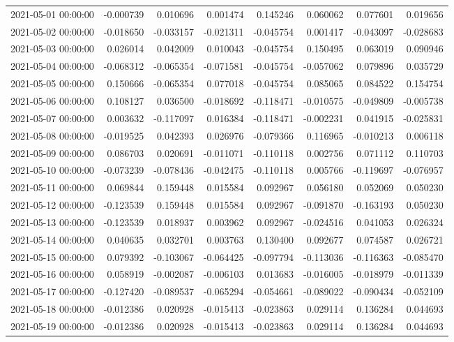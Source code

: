 \begin{tabular}{lrrrrrrr}
2021-05-01 00:00:00 & -0.000739 & 0.010696 & 0.001474 & 0.145246 & 0.060062 & 0.077601 & 0.019656 \\
2021-05-02 00:00:00 & -0.018650 & -0.033157 & -0.021311 & -0.045754 & 0.001417 & -0.043097 & -0.028683 \\
2021-05-03 00:00:00 & 0.026014 & 0.042009 & 0.010043 & -0.045754 & 0.150495 & 0.063019 & 0.090946 \\
2021-05-04 00:00:00 & -0.068312 & -0.065354 & -0.071581 & -0.045754 & -0.057062 & 0.079896 & 0.035729 \\
2021-05-05 00:00:00 & 0.150666 & -0.065354 & 0.077018 & -0.045754 & 0.085065 & 0.084522 & 0.154754 \\
2021-05-06 00:00:00 & 0.108127 & 0.036500 & -0.018692 & -0.118471 & -0.010575 & -0.049809 & -0.005738 \\
2021-05-07 00:00:00 & 0.003632 & -0.117097 & 0.016384 & -0.118471 & -0.002231 & 0.041915 & -0.025831 \\
2021-05-08 00:00:00 & -0.019525 & 0.042393 & 0.026976 & -0.079366 & 0.116965 & -0.010213 & 0.006118 \\
2021-05-09 00:00:00 & 0.086703 & 0.020691 & -0.011071 & -0.110118 & 0.002756 & 0.071112 & 0.110703 \\
2021-05-10 00:00:00 & -0.073239 & -0.078436 & -0.042475 & -0.110118 & 0.005766 & -0.119697 & -0.076957 \\
2021-05-11 00:00:00 & 0.069844 & 0.159448 & 0.015584 & 0.092967 & 0.056180 & 0.052069 & 0.050230 \\
2021-05-12 00:00:00 & -0.123539 & 0.159448 & 0.015584 & 0.092967 & -0.091870 & -0.163193 & 0.050230 \\
2021-05-13 00:00:00 & -0.123539 & 0.018937 & 0.003962 & 0.092967 & -0.024516 & 0.041053 & 0.026324 \\
2021-05-14 00:00:00 & 0.040635 & 0.032701 & 0.003763 & 0.130400 & 0.092677 & 0.074587 & 0.026721 \\
2021-05-15 00:00:00 & 0.079392 & -0.103067 & -0.064425 & -0.097794 & -0.113036 & -0.116363 & -0.085470 \\
2021-05-16 00:00:00 & 0.058919 & -0.002087 & -0.006103 & 0.013683 & -0.016005 & -0.018979 & -0.011339 \\
2021-05-17 00:00:00 & -0.127420 & -0.089537 & -0.065294 & -0.054661 & -0.089022 & -0.090434 & -0.052109 \\
2021-05-18 00:00:00 & -0.012386 & 0.020928 & -0.015413 & -0.023863 & 0.029114 & 0.136284 & 0.044693 \\
2021-05-19 00:00:00 & -0.012386 & 0.020928 & -0.015413 & -0.023863 & 0.029114 & 0.136284 & 0.044693 \\

\end{tabular}
